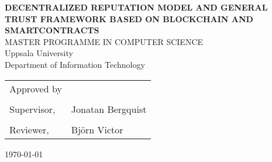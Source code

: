 
\thispagestyle{empty}

\vspace*{+5em}
\begin{center}
	\textbf{DECENTRALIZED REPUTATION MODEL AND GENERAL TRUST FRAMEWORK BASED ON BLOCKCHAIN AND SMARTCONTRACTS}\\
\vspace*{+4em}
\vspace{+2em}
MASTER PROGRAMME IN COMPUTER SCIENCE\\

\vspace*{+3em}
Uppsala University\\
Department of Information Technology\\
\vspace*{+2em}

\end{center}

\begin{tabular}{ l l }
 Approved by &   \\
  & \\
  Supervisor, & Jonatan Bergquist \\ 
  & \\
  Reviewer, & Björn Victor \\
\end{tabular}

\vspace*{+4em}

\begin{center}
\today
\end{center}
